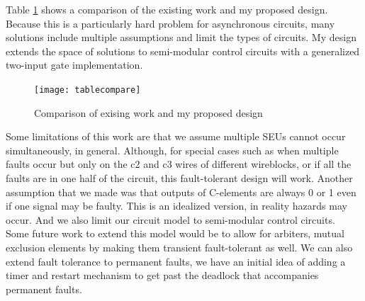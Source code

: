 \documentclass[12pt]{report}
\begin{document}
Table \ref{fig:tablec} shows a comparison of the existing work and my proposed design.  Because this is a particularly hard problem for asynchronous circuits, many solutions include multiple assumptions and limit the types of circuits.  My design extends the space of solutions to semi-modular control circuits with a generalized two-input gate implementation. 
\begin{figure}
\centering
\texttt{[image: tablecompare]}
\caption{Comparison of exising work and my proposed design}
\label{fig:tablec}
\end{figure}

Some limitations of this work are that we assume multiple SEUs cannot occur simultaneously, in general.  Although, for special cases such as when multiple faults occur but only on the c2 and c3 wires of different wireblocks, or if all the faults are in one half of the circuit, this fault-tolerant design will work.  Another assumption that we made was that outputs of C-elements are always 0 or 1 even if one signal may be faulty.  This is an idealized version, in reality hazards may occur.  And we also limit our circuit model to semi-modular control circuits.\\

Some future work to extend this model would be to allow for arbiters, mutual exclusion elements by making them transient fault-tolerant as well.  We can also extend fault tolerance to permanent faults, we have an initial idea of adding a timer and restart mechanism to get past the deadlock that accompanies permanent faults.


\nocite{*}


%


\end{document}
